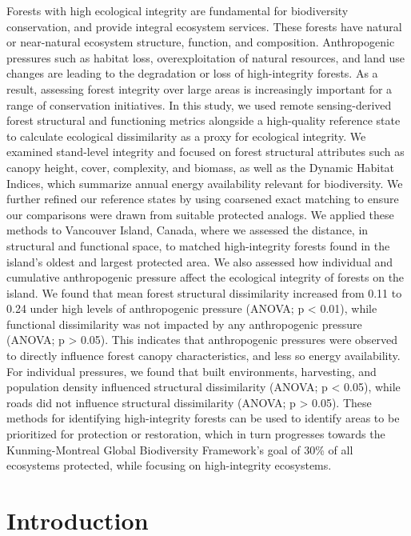 \documentclass[
]{agujournal2019}
\begin{document}
Forests with high ecological integrity are fundamental for biodiversity
conservation, and provide integral ecosystem services. These forests
have natural or near-natural ecosystem structure, function, and
composition. Anthropogenic pressures such as habitat loss,
overexploitation of natural resources, and land use changes are leading
to the degradation or loss of high-integrity forests. As a result,
assessing forest integrity over large areas is increasingly important
for a range of conservation initiatives. In this study, we used remote
sensing-derived forest structural and functioning metrics alongside a
high-quality reference state to calculate ecological dissimilarity as a
proxy for ecological integrity. We examined stand-level integrity and
focused on forest structural attributes such as canopy height, cover,
complexity, and biomass, as well as the Dynamic Habitat Indices, which
summarize annual energy availability relevant for biodiversity. We
further refined our reference states by using coarsened exact matching
to ensure our comparisons were drawn from suitable protected analogs. We
applied these methods to Vancouver Island, Canada, where we assessed the
distance, in structural and functional space, to matched high-integrity
forests found in the island's oldest and largest protected area. We also
assessed how individual and cumulative anthropogenic pressure affect the
ecological integrity of forests on the island. We found that mean forest
structural dissimilarity increased from 0.11 to 0.24 under high levels
of anthropogenic pressure (ANOVA; p \textless{} 0.01), while functional
dissimilarity was not impacted by any anthropogenic pressure (ANOVA; p
\textgreater{} 0.05). This indicates that anthropogenic pressures were
observed to directly influence forest canopy characteristics, and less
so energy availability. For individual pressures, we found that built
environments, harvesting, and population density influenced structural
dissimilarity (ANOVA; p \textless{} 0.05), while roads did not influence
structural dissimilarity (ANOVA; p \textgreater{} 0.05). These methods
for identifying high-integrity forests can be used to identify areas to
be prioritized for protection or restoration, which in turn progresses
towards the Kunming-Montreal Global Biodiversity Framework's goal of
30\% of all ecosystems protected, while focusing on high-integrity
ecosystems.

\newpage

\section{Introduction}\label{introduction}
\end{document}
